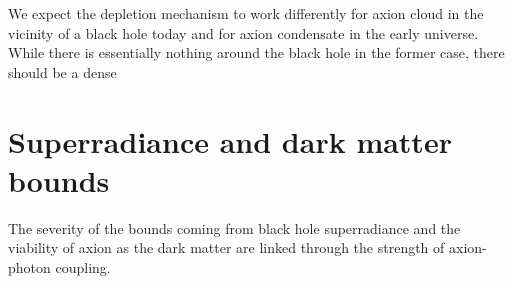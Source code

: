 \documentclass[%
 reprint,
 amsmath,amssymb,
 aps,nofootinbib
]{revtex4-1}
\begin{document}
We expect the depletion mechanism to work differently for axion cloud in the vicinity of a black hole today and for axion condensate in the early universe. While there is essentially nothing around the black hole in the former case, there should be a dense 








\section{Superradiance and dark matter bounds}
The severity of the bounds coming from black hole superradiance and the viability of axion as the dark matter are linked through the strength of axion-photon coupling.










\newpage


% 
\end{document}
